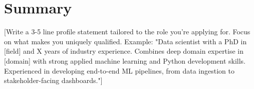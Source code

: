 \documentclass[11pt,a4paper,sans]{moderncv}
\begin{document}
\makecvtitle


\section{Summary}
\vspace{1pt}
\small{[Write a 3-5 line profile statement tailored to the role you're applying for. Focus on what makes you uniquely qualified. Example: "Data scientist with a PhD in [field] and X years of industry experience. Combines deep domain expertise in [domain] with strong applied machine learning and Python development skills. Experienced in developing end-to-end ML pipelines, from data ingestion to stakeholder-facing dashboards."]}

\end{document}
